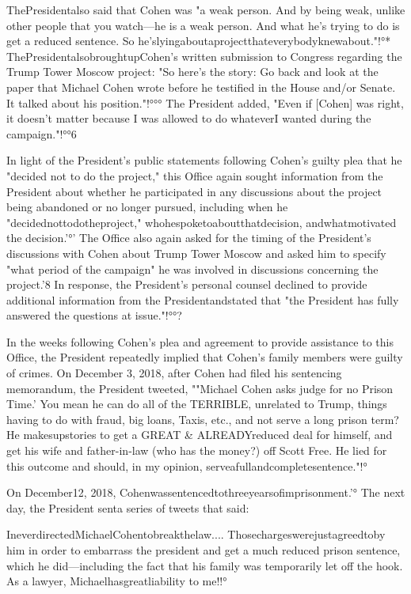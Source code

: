 ThePresidentalso said that Cohen was "a weak person.
And by being weak, unlike other people that you watch—he is a weak person.
And what he's trying to do is get a reduced sentence.
So he'slyingaboutaprojectthateverybodyknewabout."!°*
ThePresidentalsobroughtupCohen's written submission to Congress regarding the Trump Tower Moscow project: "So here's the story: Go back and look at the paper that Michael Cohen wrote before he testified in the House and/or Senate.
It talked about his position."!°°°
The President added, "Even if [Cohen] was right, it doesn't matter because I was allowed to do whateverI wanted during the campaign."!°°6

In light of the President's public statements following Cohen's guilty plea that he "decided not to do the project," this Office again sought information from the President about whether he participated in any discussions about the project being abandoned or no longer pursued, including when he "decidednottodotheproject," whohespoketoaboutthatdecision, andwhatmotivated
the decision.'°'
The Office also again asked for the timing of the President's discussions with Cohen about Trump Tower Moscow and asked him to specify "what period of the campaign" he was involved in discussions concerning the project.'8
In response, the President's personal counsel declined to provide additional information from the Presidentandstated that "the President has fully answered the questions at issue."!°°?

In the weeks following Cohen's plea and agreement to provide assistance to this Office, the President repeatedly implied that Cohen's family members were guilty of crimes.
On December 3, 2018, after Cohen had filed his sentencing memorandum, the President tweeted, ""Michael Cohen asks judge for no Prison Time.'
You mean he can do all of the TERRIBLE, unrelated to Trump, things having to do with fraud, big loans, Taxis, etc., and not serve a long prison term?
He makesupstories to get a GREAT \& ALREADYreduced deal for himself, and get his wife and father-in-law (who has the money?) off Scott Free.
He lied for this outcome and should, in my opinion, serveafullandcompletesentence."!°

On December12, 2018, Cohenwassentencedtothreeyearsofimprisonment.'°
The next day, the President senta series of tweets that said:

IneverdirectedMichaelCohentobreakthelaw....
Thosechargeswerejustagreedtoby him in order to embarrass the president and get a much reduced prison sentence, which he did—including the fact that his family was temporarily let off the hook.
As a lawyer, Michaelhasgreatliability to me!!°

